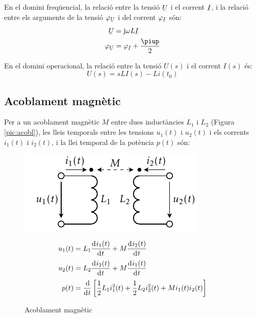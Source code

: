 En el domini freq\"{u}encial, la relaci\'{o} entre la tensi\'{o} $\cmplx{U}$ i el corrent $\cmplx{I}$, i la relaci\'{o} entre els arguments de la tensi\'{o} $\varphi_{\cmplx{U}}$ i del corrent $\varphi_{\cmplx{I}}$ s\'{o}n:
\begin{align}
   \cmplx{U} &= \ju \omega L \cmplx{I} \\
   \varphi_{\cmplx{U}} &= \varphi_{\cmplx{I}} + \frac{\piup}{2}
\end{align}

 En el domini operacional, la relaci\'{o} entre la tensi\'{o} $U(s)$ i el corrent $I(s)$ \'{e}s:
\begin{equation}
   U(s) = s L I(s) - L i(t_0)
\end{equation}


\subsection{Acoblament magn\`{e}tic} 

Per a un acoblament magn\`{e}tic $M$ entre dues
induct\`{a}ncies $L_1$ i $L_2$ (Figura \vref{pic:acobl}), les lleis temporals entre les
tensions $u_1(t)$ i $u_2(t)$ i els corrents $i_1(t)$ i $i_2(t)$,  i la llei temporal
de la pot\`{e}ncia $p(t)$ s\'{o}n: \pagebreak
\begin{figure}[h!]
\hfill
\begin{minipage}[b]{6cm}
   \includegraphics{Imatges/Cap-Fonaments-Acobl-Magnetic.pdf}
   \caption{Acoblament magn\`{e}tic} \label{pic:acobl}
\end{minipage}
\hfill
\begin{minipage}[b][3.8cm][t]{10cm}
   \begin{align}
      u_1(t) &= L_1 \deriv{i_1(t)}{t} + M \deriv{i_2(t)}{t} \\
      u_2(t) &= L_2 \deriv{i_2(t)}{t} + M \deriv{i_1(t)}{t} \\
      p(t) &= \frac{\diff}{\diff t} \left[ \frac{1}{2} L_1 i_1^2(t) + \frac{1}{2} L_2 i_2^2(t) +
      M i_1(t) i_2(t) \right]
   \end{align}
\end{minipage}
\end{figure}


